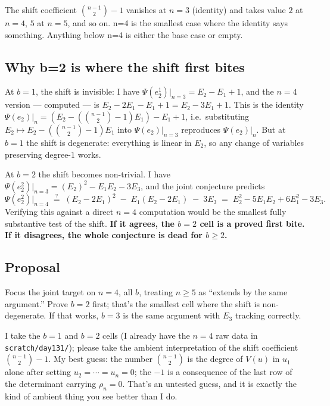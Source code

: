 \documentclass[11pt,a4paper]{article}
\begin{document}
The shift coefficient $\binom{n-1}{2}-1$ vanishes at $n=3$ (identity) and takes value
$2$ at $n=4$, $5$ at $n=5$, and so on. n=4 is the smallest case where the identity
says something. Anything below n=4 is either the base case or empty.

\subsection*{Why b=2 is where the shift first bites}

At $b=1$, the shift is invisible: I have $\Psi(e_2^1)|_{n=3} = E_2 - E_1 + 1$, and the
$n=4$ version --- computed --- is $E_2 - 2E_1 - E_1 + 1 = E_2 - 3E_1 + 1$. This is the
identity $\Psi(e_2)|_{n} = (E_2 - (\binom{n-1}{2}-1)E_1) - E_1 + 1$, i.e.\ substituting
$E_2 \mapsto E_2 - (\binom{n-1}{2}-1)E_1$ into $\Psi(e_2)|_{n=3}$ reproduces
$\Psi(e_2)|_{n}$. But at $b=1$ the shift is degenerate: everything is linear in $E_2$,
so any change of variables preserving degree-$1$ works.

At $b=2$ the shift becomes non-trivial. I have
$\Psi(e_2^2)|_{n=3} = (E_2)^2 - E_1 E_2 - 3 E_3$, and the joint conjecture predicts
\[
\Psi(e_2^2)|_{n=4}
\;\stackrel{?}{=}\;
(E_2 - 2E_1)^2 \;-\; E_1(E_2 - 2E_1) \;-\; 3E_3
\;=\;
E_2^2 - 5 E_1 E_2 + 6 E_1^2 - 3 E_3.
\]
Verifying this against a direct $n=4$ computation would be the smallest fully
substantive test of the shift. \textbf{If it agrees, the $b=2$ cell is a proved
first bite. If it disagrees, the whole conjecture is dead for $b\ge 2$.}

\subsection*{Proposal}

Focus the joint target on $\boxed{n=4}$, all $b$, treating $n\ge 5$ as ``extends by
the same argument.'' Prove $b=2$ first; that's the smallest cell where the shift is
non-degenerate. If that works, $b=3$ is the same argument with $E_3$ tracking
correctly.

I take the $b=1$ and $b=2$ cells (I already have the $n=4$ raw data in
\texttt{scratch/day131/}); please take the ambient interpretation of the shift
coefficient $\binom{n-1}{2}-1$. My best guess: the number $\binom{n-1}{2}$ is the
degree of $V(u)$ in $u_1$ alone after setting $u_2=\cdots=u_n=0$; the $-1$ is a
consequence of the last row of the determinant carrying $\rho_n=0$. That's an
untested guess, and it is exactly the kind of ambient thing you see better than I
do.
\end{document}
